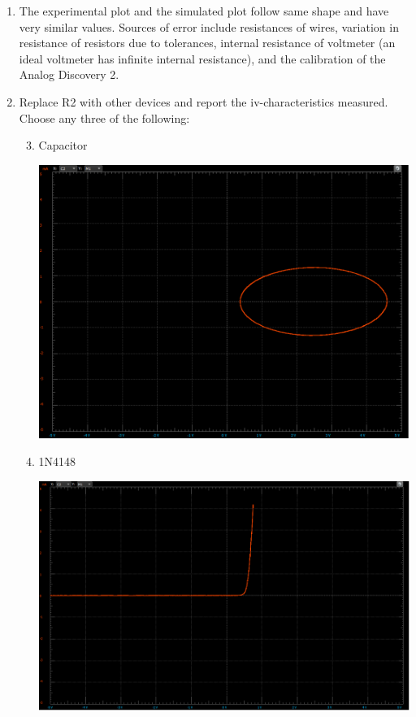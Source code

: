 \documentclass[12pt]{article}
\begin{document}
\begin{enumerate}
    \item The experimental plot and the simulated plot follow same shape and have very similar values. Sources of error include resistances of wires, variation in resistance of resistors due to tolerances, internal resistance of voltmeter (an ideal voltmeter has infinite internal resistance), and the calibration of the Analog Discovery 2.
    \pagebreak
    \item Replace R2 with other devices and report the iv-characteristics measured. Choose any three of the following:
    \begin{enumerate}
        \setcounter{enumii}{2}
        \item Capacitor
        \begin{center}
            \includegraphics[width=0.97\linewidth]{images/B3c.png}
        \end{center}
        \item 1N4148
        \begin{center}
            \includegraphics[width=\linewidth]{images/B3d.png}

\end{center}
\end{enumerate}
\end{enumerate}
\end{document}
